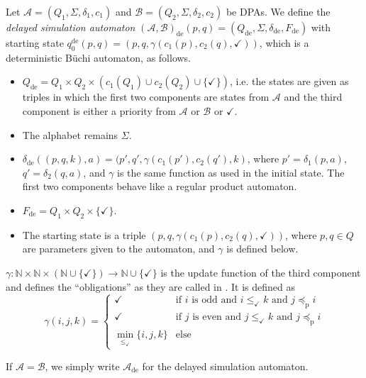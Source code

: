 \begin{defn}
	Let $\mathcal{A} = (Q_1, \Sigma, \delta_1, c_1)$ and $\mathcal{B} = (Q_2, \Sigma, \delta_2, c_2)$ be DPAs. We define the \emph{delayed simulation automaton} $(\mathcal{A},\mathcal{B})_\text{de}(p, q) = (Q_\text{de}, \Sigma, \delta_\text{de}, F_\text{de})$ with starting state $q_0^\text{de}(p, q) = (p, q, \gamma(c_1(p), c_2(q), \checkmark))$, which is a deterministic Büchi automaton, as follows.
	
	\begin{itemize}
		\item $Q_\text{de} = Q_1 \times Q_2 \times (c_1(Q_1) \cup c_2(Q_2) \cup \{ \checkmark \})$, i.e. the states are given as triples in which the first two components are states from $\mathcal{A}$ and the third component is either a priority from $\mathcal{A}$ or $\mathcal{B}$ or $\checkmark$.
		\item The alphabet remains $\Sigma$.
		\item $\delta_\text{de}( (p, q, k), a ) = ( p', q', \gamma(c_1(p'), c_2(q'), k)$, where $p' = \delta_1(p, a)$, $q' = \delta_2(q, a)$, and $\gamma$ is the same function as used in the initial state. The first two components behave like a regular product automaton.
		\item $F_\text{de} = Q_1 \times Q_2 \times \{ \checkmark \}$.
		\item The starting state is a triple $(p, q, \gamma(c_1(p), c_2(q), \checkmark))$, where $p, q \in Q$ are parameters given to the automaton, and $\gamma$ is defined below.
	\end{itemize}
	
	$\gamma : \mathbb{N} \times \mathbb{N} \times (\mathbb{N} \cup \{\checkmark\}) \rightarrow \mathbb{N} \cup \{\checkmark\}$ is the update function of the third component and defines the \enquote{obligations} as they are called in \cite{}. It is defined as 
	$$ \gamma(i, j, k) = \begin{cases}
		\checkmark & \text{if } i \text{ is odd and } i \leq_\checkmark k \text{ and } j \preceq_\text{p} i \\
		\checkmark & \text{if } j \text{ is even and } j \leq_\checkmark k \text{ and } j \preceq_\text{p} i \\
		\min_{\leq_\checkmark} \{ i,j,k \} & \text{else}
	\end{cases} $$
	
	If $\mathcal{A} = \mathcal{B}$, we simply write $\mathcal{A}_\text{de}$ for the delayed simulation automaton.
\end{defn}


